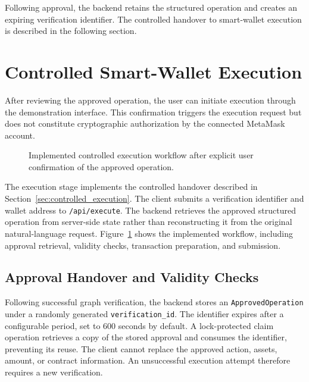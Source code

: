 Following approval, the backend retains the structured
operation and creates an expiring verification identifier.
The controlled handover to smart-wallet execution is
described in the following section.


\section{Controlled Smart-Wallet Execution}
\label{sec:controlled_execution_implementation}


After reviewing the approved operation, the user can
initiate execution through the demonstration interface.
This confirmation triggers the execution request but does
not constitute cryptographic authorization by the connected
MetaMask account. 




\begin{figure}[H]
    \centering
    \resizebox{0.95\linewidth}{!}{%
    }
    \caption{Implemented controlled execution workflow after explicit user
confirmation of the approved operation.}
    \label{fig:controlled_execution_flow}
\end{figure}
The execution stage implements the controlled handover
described in Section~\ref{sec:controlled_execution}.
The client submits a verification identifier and wallet
address to \texttt{/api/execute}. The backend retrieves
the approved structured operation from server-side state
rather than reconstructing it from the original
natural-language request. Figure~\ref{fig:controlled_execution_flow}
shows the implemented workflow, including approval retrieval,
validity checks, transaction preparation, and submission.
\subsection{Approval Handover and Validity Checks}

Following successful graph verification, the backend
stores an \texttt{ApprovedOperation} under a randomly
generated \texttt{verification\_id}. The identifier
expires after a configurable period, set to 600 seconds
by default. A lock-protected claim operation retrieves
a copy of the stored approval and consumes the identifier,
preventing its reuse. The client cannot replace the
approved action, assets, amount, or contract information.
An unsuccessful execution attempt therefore requires
a new verification.

